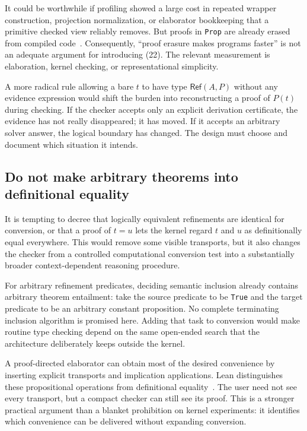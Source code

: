 \documentclass[11pt,letterpaper]{article}
\newcommand{\code}[1]{\nolinkurl{#1}}
\theoremstyle{definition}
\theoremstyle{remark}
\begin{document}
It could be worthwhile if profiling showed a large cost in repeated wrapper
construction, projection normalization, or elaborator bookkeeping that a
primitive checked view reliably removes. But proofs in \code{Prop} are already
erased from compiled code~\cite{LeanProps}. Consequently, ``proof erasure makes
programs faster'' is not an adequate argument for introducing (22). The relevant
measurement is elaboration, kernel checking, or representational simplicity.

A more radical rule allowing a bare $t$ to have type $\mathsf{Ref}(A,P)$ without
any evidence expression would shift the burden into reconstructing a proof of
$P(t)$ during checking. If the checker accepts only an explicit derivation
certificate, the evidence has not really disappeared; it has moved. If it accepts
an arbitrary solver answer, the logical boundary has changed. The design must
choose and document which situation it intends.

\subsection{Do not make arbitrary theorems into definitional equality}
It is tempting to decree that logically equivalent refinements are identical
for conversion, or that a proof of $t=u$ lets the kernel regard $t$ and $u$ as
definitionally equal everywhere. This would remove some visible transports, but
it also changes the checker from a controlled computational conversion test
into a substantially broader context-dependent reasoning procedure.

For arbitrary refinement predicates, deciding semantic inclusion already
contains arbitrary theorem entailment: take the source predicate to be
\code{True} and the target predicate to be an arbitrary constant proposition.
No complete terminating inclusion algorithm is promised here. Adding that task
to conversion would make routine type checking depend on the same open-ended
search that the architecture deliberately keeps outside the kernel.

A proof-directed elaborator can obtain most of the desired convenience by
inserting explicit transports and implication applications. Lean distinguishes
these propositional operations from definitional equality~\cite{LeanEq}. The
user need not see every transport, but a compact checker can still see its proof.
This is a stronger practical argument than a blanket prohibition on kernel
experiments: it identifies which convenience can be delivered without expanding
conversion.
\end{document}

